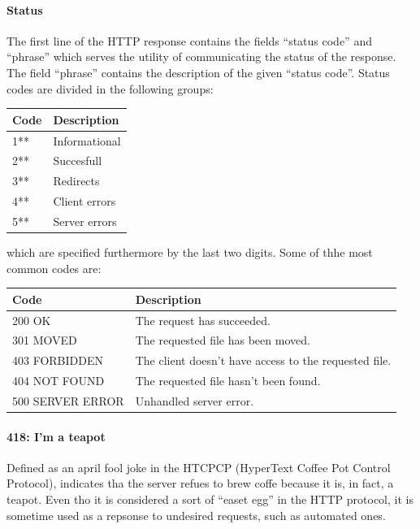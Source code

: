\paragraph{Status}
The first line of the HTTP response contains the fields ``status code'' and ``phrase'' which serves the utility of communicating the status of the response. The field ``phrase'' contains the description of the given ``status code''. Status codes are divided in the following groups:
\begin{center}
    \begin{tabular}{l|l}
        \toprule
        \textbf{Code} & \textbf{Description} \\
        \midrule
        1**           & Informational        \\
        2**           & Succesfull           \\
        3**           & Redirects            \\
        4**           & Client errors        \\
        5**           & Server errors        \\
        \bottomrule
    \end{tabular}
\end{center}
which are specified furthermore by the last two digits. Some of thhe most common codes are:
\begin{center}
    \begin{tabular}{l|l}
        \toprule
        \textbf{Code}    & \textbf{Description}                                  \\
        \midrule
        200 OK           & The request has succeeded.                            \\
        301 MOVED        & The requested file has been moved.                    \\
        403 FORBIDDEN    & The client doesn't have access to the requested file. \\
        404 NOT FOUND    & The requested file hasn't been found.                 \\
        500 SERVER ERROR & Unhandled server error.                               \\
        \bottomrule
    \end{tabular}
\end{center}

\paragraph{418: I'm a teapot}
Defined as an april fool joke in the HTCPCP (HyperText Coffee Pot Control Protocol), indicates tha the server refues to brew coffe because it is, in fact, a teapot. Even tho it is considered a sort of ``easet egg'' in the HTTP protocol, it is sometime used as a repsonse to undesired requests, such as automated ones.

